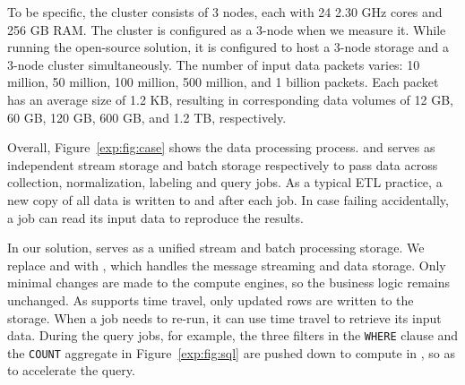 

 
  To be specific, the cluster consists of 3 nodes, each with 24  2.30 GHz cores and 256 GB RAM. The cluster is configured as a 3-node \sys when we measure it.  While running the open-source solution, it is configured to host a 3-node \hdfs storage and a 3-node \kafka cluster simultaneously. The number of input data packets varies: 10 million, 50 million, 100 million, 500 million, and 1 billion packets. Each packet has an average size of 1.2 KB, resulting in corresponding data volumes of 12 GB, 60 GB, 120 GB, 600 GB, and 1.2 TB, respectively.

Overall, Figure~\ref{exp:fig:case} shows the data processing process.  \kafka and \hdfs serves as independent stream storage and batch storage respectively to pass data across collection, normalization, labeling and query jobs.
 As a typical ETL practice, a new copy of all data is written to \hdfs and \kafka after each job. In case  failing accidentally, a job can read its input data to reproduce the results.
 
 

 
  In our solution, \sys serves as a unified stream and batch processing storage. 
  We replace \kafka and \hdfs with \sys, which handles the message streaming and data storage. 
  Only minimal changes are made to the compute engines, so the business logic remains unchanged. 
  As \sys supports time travel, only updated rows are written to the storage. When a job needs to re-run, it can use time travel to retrieve its input data.  During the query jobs, for example, the three filters in the \texttt{WHERE} clause and the \texttt{COUNT} aggregate in Figure~\ref{exp:fig:sql} are pushed down to compute in \sys, so as to  accelerate the query.










